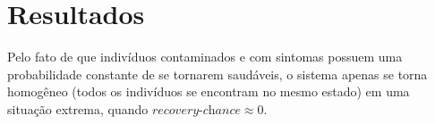 \documentclass{article}
\begin{document}
\section{Resultados}
Pelo fato de que indivíduos contaminados e com sintomas possuem uma probabilidade constante de se tornarem saudáveis, o sistema apenas se torna homogêneo (todos os indivíduos se encontram no mesmo estado) em uma situação extrema, quando $\textit{recovery-chance} \approx 0$.






\clearpage
 
\end{document}
